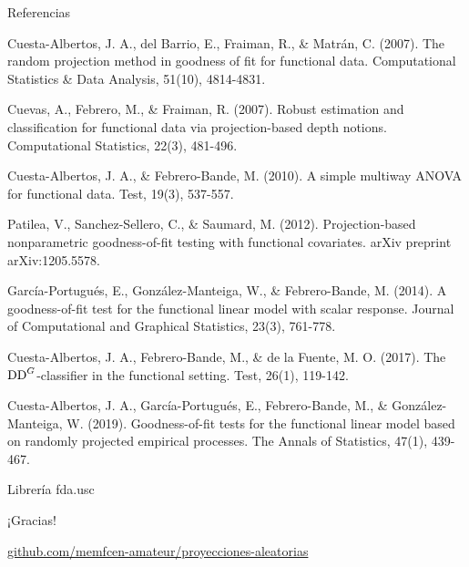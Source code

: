\documentclass[10pt,spanish,handout]{beamer}\usepackage[]{graphicx}\usepackage[]{color}
\begin{document}
\begin{frame}[shrink=30]{Referencias}

\appendix
\begin{thebibliography}{References}
Cuesta-Albertos, J. A., del Barrio,
E., Fraiman, R., \& Matrán, C. (2007). The random projection method
in goodness of fit for functional data. Computational Statistics \&
Data Analysis, 51(10), 4814-4831.

Cuevas, A., Febrero, M., \& Fraiman,
R. (2007). Robust estimation and classification for functional data
via projection-based depth notions. Computational Statistics, 22(3),
481-496.

Cuesta-Albertos, J. A., \& Febrero-Bande,
M. (2010). A simple multiway ANOVA for functional data. Test, 19(3),
537-557.

Patilea, V., Sanchez-Sellero,
C., \& Saumard, M. (2012). Projection-based nonparametric goodness-of-fit
testing with functional covariates. arXiv preprint arXiv:1205.5578.

García-Portugués, E., González-Manteiga,
W., \& Febrero-Bande, M. (2014). A goodness-of-fit test for the functional
linear model with scalar response. Journal of Computational and Graphical
Statistics, 23(3), 761-778. 

Cuesta-Albertos, J. A., Febrero-Bande,
M., \& de la Fuente, M. O. (2017). The $\hbox{DD}^{G}$-classifier
in the functional setting. Test, 26(1), 119-142.

Cuesta-Albertos, J. A., García-Portugués,
E., Febrero-Bande, M., \& González-Manteiga, W. (2019). Goodness-of-fit
tests for the functional linear model based on randomly projected
empirical processes. The Annals of Statistics, 47(1), 439-467.

 Librería fda.usc
\end{thebibliography}
\end{frame}
%
\begin{frame}[standout]

{\huge{}¡Gracias!}{\huge\par}

\pause{}

{\scriptsize{}\alert{{\scriptsize{}\href{https://github.com/memfcen-amateur/proyecciones-aleatorias/tree/master}{github.com/memfcen-amateur/proyecciones-aleatorias}}}}{\scriptsize\par}

\end{frame}
\end{document}

